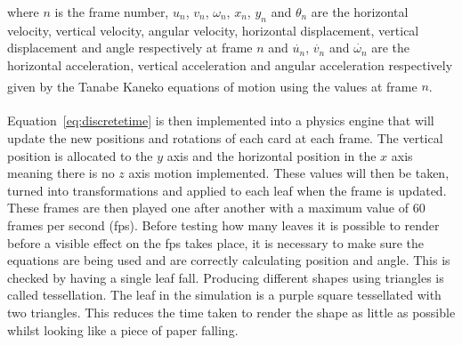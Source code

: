 \noindent where $n$ is the frame number, $u_{n}$, $v_{n}$, $\omega_{n}$, $x_{n}$, $y_{n}$ and $\theta_{n}$ are the horizontal velocity, vertical velocity, angular velocity, horizontal displacement, vertical displacement and angle respectively at frame $n$ and $\dot{u_{n}}$, $\dot{v_{n}}$ and $\dot{\omega_{n}}$ are the horizontal acceleration, vertical acceleration and angular acceleration respectively given by the Tanabe Kaneko equations of motion\textsuperscript{\cite{tanabe1994behavior}} using the values at frame $n$.
\\
\\
\noindent Equation~\ref{eq:discretetime} is then implemented into a physics engine that will update the new positions and rotations of each card at each frame. The vertical position is allocated to the $y$ axis and the horizontal position in the $x$ axis meaning there is no $z$ axis motion implemented. These values will then be taken, turned into transformations and applied to each leaf when the frame is updated. These frames are then played one after another with a maximum value of 60 frames per second (fps). Before testing how many leaves it is possible to render before a visible effect on the fps takes place, it is necessary to make sure the equations are being used and are correctly calculating position and angle. This is checked by having a single leaf fall. Producing different shapes using triangles is called tessellation. The leaf in the simulation is a purple square tessellated with two triangles. This reduces the time taken to render the shape as little as possible whilst looking like a piece of paper falling.

